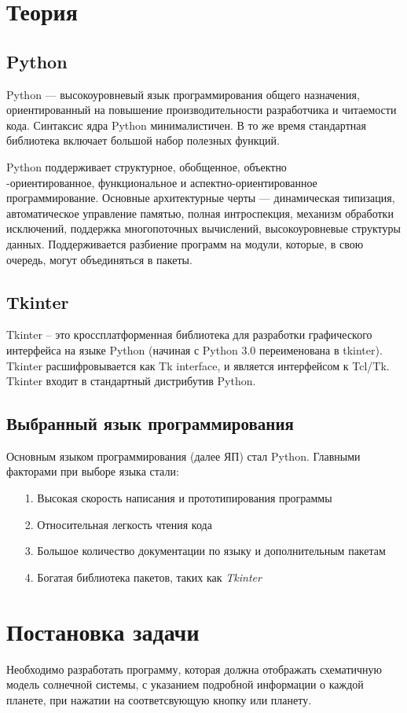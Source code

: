\documentclass[11pt,a4paper]{report}
\begin{document}
\tableofcontents
\newpage
\section{Теория}
\subsection{Python}
Python — высокоуровневый язык программирования общего назначения, ориентированный на повышение производительности разработчика и читаемости кода. Синтаксис ядра Python минималистичен. В то же время стандартная библиотека включает большой набор полезных функций.

Python поддерживает структурное, обобщенное, объектно\\-ориентированное, функциональное и аспектно-ориентированное программирование. Основные архитектурные черты — динамическая типизация, автоматическое управление памятью, полная интроспекция, механизм обработки исключений, поддержка многопоточных вычислений, высокоуровневые структуры данных. Поддерживается разбиение программ на модули, которые, в свою очередь, могут объединяться в пакеты. 
\subsection{Tkinter}
Tkinter – это кроссплатформенная библиотека для разработки графического интерфейса на языке Python (начиная с Python 3.0 переименована в tkinter). Tkinter расшифровывается как Tk interface, и является интерфейсом к Tcl/Tk.
Tkinter входит в стандартный дистрибутив Python.

\subsection{Выбранный язык программирования}
Основным языком программирования (далее ЯП) стал Python. Главными факторами при выборе языка стали:
\begin{enumerate}
\item[1.]Высокая скорость написания и прототипирования программы
\item[2.]Относительная легкость чтения кода 
\item[3.]Большое количество документации по языку и дополнительным пакетам
\item[4.]Богатая библиотека пакетов, таких как \textit{Tkinter} 
\end{enumerate} 
\section{Постановка задачи}
Необходимо разработать программу, которая  должна отображать схематичную модель солнечной системы, с указанием подробной информации о каждой  планете, при нажатии на соответсвующую кнопку или планету. 
\end{document}
